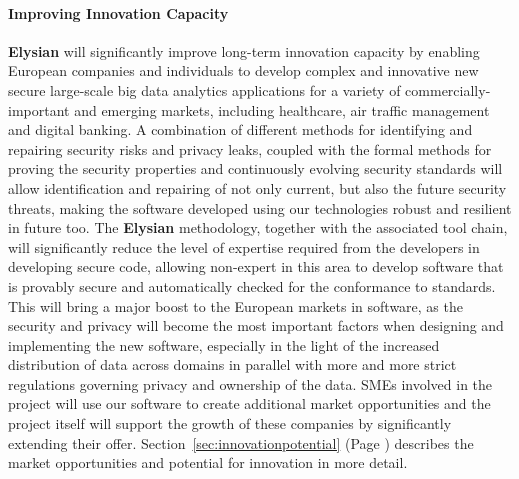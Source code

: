 \documentclass[a4paper,11pt]{article}
\newcommand{\project}[1]{\textbf{#1}\xspace}
\newcommand{\SECURITY}{\project{Elysian}}
\newcommand{\TheProject}{\SECURITY}
\begin{document}
\paragraph*{Improving Innovation Capacity}
\noindent
\TheProject{} will significantly improve long-term innovation capacity by enabling European companies and individuals to develop complex and innovative new secure large-scale big data analytics applications for a variety of commercially-important and emerging markets, including healthcare, air traffic management and digital banking. A combination of different methods for identifying and repairing security risks and privacy leaks, coupled with the formal methods for proving the security properties and continuously evolving security standards will allow identification and repairing of not only current, but also the future security threats, making the software developed using our technologies robust and resilient in future too. The \TheProject{} methodology, together with the associated tool chain, will significantly reduce the level of expertise required from the developers in developing secure code, allowing non-expert in this area to develop software that is provably secure and automatically checked for the conformance to standards. This will bring a major boost to the European markets in software, as the security and privacy will become the most important factors when designing and implementing the new software, especially in the light of the increased distribution of data across domains in parallel with more and more strict regulations governing privacy and ownership of the data. SMEs involved in the project will use our software to create additional market opportunities and the project itself will support the growth of these companies by significantly extending their offer. Section~\ref{sec:innovationpotential} (Page \pageref{sec:innovationpotential}) describes the market opportunities and potential for innovation in more detail.
\end{document}
